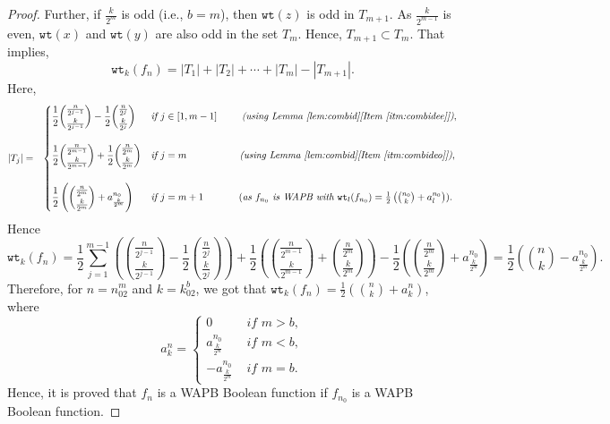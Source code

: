 \documentclass{article}[12pt]
\newcommand{\wt}{\mathtt{wt}}
\begin{document}
\begin{proof}
Further, if $\frac{k}{2^m}$ is odd (i.e., $b = m$), then $\wt(z)$ is odd in $T_{m+1}$.
As $\frac{k}{2^{m-1}}$ is even, $\wt(x)$ and $\wt(y)$ are also odd in the set $T_m$.
Hence, $T_{m+1} \subset T_m$. That implies,
$$\wt_k(f_n) = |T_1| + |T_2| + \cdots + |T_m| - |T_{m+1}|.$$
Here, 
\begin{eqnarray*}
|T_j| & = & \begin{cases}
            \displaystyle{\frac{1}{2}{\frac{n}{2^{j-1}} \choose \frac{k}{2^{j-1}}} - \frac{1}{2}{\frac{n}{2^j} \choose \frac{k}{2^j}}} & \textit{if } j \in [1,m-1]    \hspace{.35in} \textit{(using Lemma~\ref{lem:combid}[Item~\ref{itm:combidee}])},\\ & \\
            \displaystyle{\frac{1}{2}{\frac{n}{2^{m-1}} \choose \frac{k}{2^{m-1}}} + \frac{1}{2}{\frac{n}{2^m} \choose \frac{k}{2^m}}} & \textit{if } j  = m   \hspace{.75in} \textit{(using Lemma~\ref{lem:combid}[Item~\ref{itm:combideo}])},\\ & \\
           \displaystyle{\frac{1}{2}\left({\frac{n}{2^m} \choose \frac{k}{2^m}} + a_\frac{k}{2^m}^{n_0}\right)} & \textit{if } j = m+1 \hspace{.5in} (\textit{as $f_{n_0}$ is WAPB with }\wt_l(f_{n_0}) = \frac{1}{2}\left({n_0 \choose k}+a_l^{n_0}\right)).
    \end{cases}
    \end{eqnarray*}
    Hence $$\displaystyle{\wt_k(f_n) = \frac{1}{2} \sum_{j=1}^{m-1}\left({\frac{n}{2^{j-1}} \choose \frac{k}{2^{j-1}}} - \frac{1}{2}{\frac{n}{2^j} \choose \frac{k}{2^j}}\right) + \frac{1}{2}\left(
    {\frac{n}{2^{m-1}} \choose \frac{k}{2^{m-1}}} + {\frac{n}{2^m} \choose \frac{k}{2^m}}\right) - \frac{1}{2}\left({\frac{n}{2^m} \choose \frac{k}{2^m}} + a_\frac{k}{2^m}^{n_0}\right) = \frac{1}{2}\left({n \choose k} - a_\frac{k}{2^m}^{n_0}\right) }.$$
    Therefore, for $n = n_02^m$ and $k = k_02^b$, we got that $\wt_k(f_n) = \frac{1}{2}\left({n \choose k} + a_k^n\right)$, where
    $$a_k^n = 
    \begin{cases}
        0 & \textit{ if } m > b, \\
        a_\frac{k}{2^m}^{n_0} & \textit{ if } m < b, \\
        - a_\frac{k}{2^m}^{n_0} & \textit{ if } m = b.
    \end{cases}$$
    Hence, it is proved that $f_n$ is a WAPB Boolean function if $f_{n_0}$ is a WAPB Boolean function.
 \end{proof}
\end{document}

